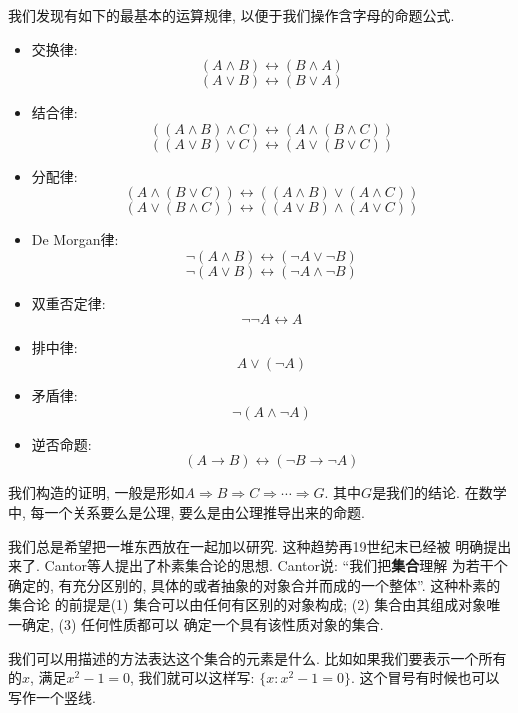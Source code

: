 \begin{theorem}[最基本的逻辑符号的运算规律]
    我们发现有如下的最基本的运算规律, 以便于我们操作含字母的命题公式. 
    \begin{itemize}[noitemsep]
    
        \item 交换律:
      \[
        (A \land B) \leftrightarrow (B \land A)
      \]
      \[
        (A \lor B) \leftrightarrow (B \lor A)
      \]
    \item 结合律:
      \[
        ((A \land B) \land C) \leftrightarrow (A \land (B \land C))
      \]
      \[
        ((A \lor B) \lor C) \leftrightarrow (A \lor (B \lor C))
      \]
    \item 分配律:
      \[
        (A \land (B \lor C)) \leftrightarrow ((A \land B) \lor (A \land C))
      \]
      \[
        (A \lor (B \land C)) \leftrightarrow ((A \lor B) \land (A \lor C))
      \]
    \item De Morgan律: 
      \[
        \lnot (A \land B) \leftrightarrow (\lnot A \lor \lnot B)
      \]
      \[
        \lnot (A \lor B) \leftrightarrow (\lnot A \land \lnot B)
      \]
      \item 双重否定律:
        \[
            \lnot \lnot A \leftrightarrow A
        \]
        \item 排中律:
        \[
            A \lor (\lnot A)
        \]
        \item 矛盾律:
        \[
            \lnot (A \land \lnot A)
        \]
        \item 逆否命题:
        \[
            (A \to B) \leftrightarrow (\lnot B \to \lnot A)
        \]
    \end{itemize}

\end{theorem}

我们构造的证明, 一般是形如$A\Rightarrow B\Rightarrow C \Rightarrow \cdots \Rightarrow G$.
其中$G$是我们的结论. 在数学中, 每一个关系要么是公理, 要么是由公理推导出来的命题. 

 我们总是希望把一堆东西放在一起加以研究. 这种趋势再19世纪末已经被
明确提出来了. Cantor等人提出了朴素集合论的思想. Cantor说: ``我们把\textbf{集合}理解
为若干个确定的, 有充分区别的, 具体的或者抽象的对象合并而成的一个整体''. 这种朴素的集合论
的前提是(1) 集合可以由任何有区别的对象构成; (2) 集合由其组成对象唯一确定, (3) 任何性质都可以
确定一个具有该性质对象的集合. 

我们可以用描述的方法表达这个集合的元素是什么. 比如如果我们要表示一个所有的$x$, 满足$x^2-1=0$,
我们就可以这样写: $\{x: x^2-1=0\}.$ 这个冒号有时候也可以写作一个竖线.

